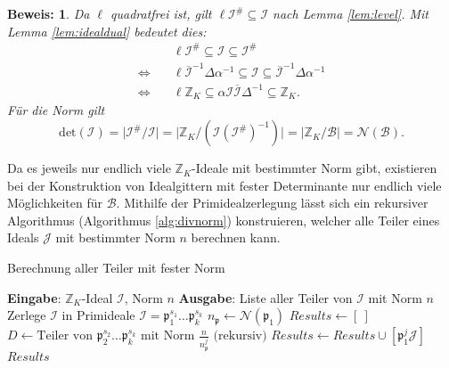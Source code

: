 \documentclass[12pt,a4paper,halfparskip,headsepline,bibtotocnumbered]{scrreprt}
\theoremstyle{nummermitklammern}
\theoremstyle{nonumberbreak}
\newtheorem{beweis}{Beweis:}
\newcommand{\Z}{\mathbb{Z}}
\newcommand{\B}{\mathcal{B}}
\newcommand{\No}{\mathcal{N}}
\newcommand{\I}{\mathcal{I}}
\newcommand{\J}{\mathcal{J}}
\newcommand{\p}{\mathfrak{p}}
\begin{document}
\begin{beweis}
	Da $\ell$ quadratfrei ist, gilt $\ell \I^\# \subseteq \I$ nach Lemma \eqref{lem:level}. Mit Lemma \eqref{lem:idealdual} bedeutet dies:
	\begin{align*}
		&\ell \I^\# \subseteq \I \subseteq \I^\#\\
		\Leftrightarrow\quad& \ell \overline{\I}^{-1} \Delta \alpha^{-1} \subseteq \I \subseteq \overline{\I}^{-1} \Delta \alpha^{-1}\\
		\Leftrightarrow\quad& \ell \Z_K \subseteq \alpha \I \overline{\I} \Delta^{-1} \subseteq \Z_K.
	\end{align*}
	Für die Norm gilt
	\begin{equation*}
		\text{det}(\I) = \vert \I^\# / \I \vert = \vert \Z_K / \left(\I\left(\I^\#\right)^{-1}\right) \vert = \vert \Z_K / \B \vert = \No(\B).
	\end{equation*}
\end{beweis}

Da es jeweils nur endlich viele $\Z_K$-Ideale mit bestimmter Norm gibt, existieren bei der Konstruktion von Idealgittern mit fester Determinante nur endlich viele Möglichkeiten für $\B$. Mithilfe der Primidealzerlegung lässt sich ein rekursiver Algorithmus (Algorithmus \eqref{alg:divnorm}) konstruieren, welcher alle Teiler eines Ideals $\J$ mit bestimmter Norm $n$ berechnen kann.

\begin{algorithm}
	\caption{Berechnung aller Teiler mit fester Norm}\label{alg:divnorm}
	\begin{algorithmic}[1]
		\State \textbf{Eingabe}: $\Z_K$-Ideal $\I$, Norm $n$
		\State \textbf{Ausgabe}: Liste aller Teiler von $\I$ mit Norm $n$
		\\
		 \Return {$\left[ \Z_K \right]$} \EndIf
		\If {$n \nmid \No(\I))$} \Return {$\left[ \ \right]$} \EndIf
		\If {$\No(\I) = n$} \Return {$\left[ \I \right]$} \EndIf
		\State Zerlege $\I$ in Primideale $\I = \p_1^{s_1} \dots \p_k^{s_k}$
		\State $n_\p \gets \No(\p_1)$
		\State $Results \gets \left[ \ \right]$
			\If {$n_\p^j \mid n$}
				\State $D \gets \text{Teiler von } \p_2^{s_2} \dots \p_k^{s_k} \text{ mit Norm } \frac{n}{n_\p^j} \text{ (rekursiv)}$
				\For {$\J \in D$}
					\State $Results \gets Results \cup \left[\p_1^j \J \right]$
				\EndFor
			\EndIf
		\EndFor
		\State \Return $Results$
	\end{algorithmic}
\end{algorithm}
\end{document}
